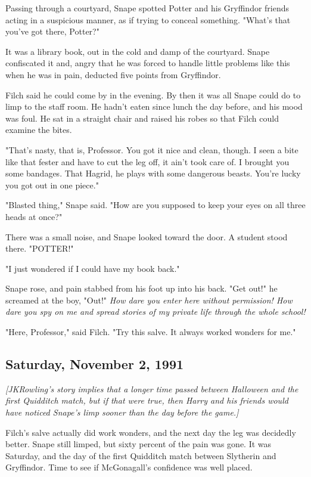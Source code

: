 \documentclass[a4paper,11pt]{article}
\begin{document}
Passing through a courtyard, Snape spotted Potter and his Gryffindor friends acting in a suspicious manner, as if trying to conceal something. "What's that you've got there, Potter?"

It was a library book, out in the cold and damp of the courtyard. Snape confiscated it and, angry that he was forced to handle little problems like this when he was in pain, deducted five points from Gryffindor.

Filch said he could come by in the evening. By then it was all Snape could do to limp to the staff room. He hadn't eaten since lunch the day before, and his mood was foul. He sat in a straight chair and raised his robes so that Filch could examine the bites.

"That's nasty, that is, Professor. You got it nice and clean, though. I seen a bite like that fester and have to cut the leg off, it ain't took care of. I brought you some bandages. That Hagrid, he plays with some dangerous beasts. You're lucky you got out in one piece."

"Blasted thing," Snape said. "How are you supposed to keep your eyes on all three heads at once?"

There was a small noise, and Snape looked toward the door. A student stood there. "POTTER!"

"I just wondered if I could have my book back."

Snape rose, and pain stabbed from his foot up into his back. "Get out!" he screamed at the boy, "Out!" \emph{How dare you enter here without permission! How dare you spy on me and spread stories of my private life through the whole school!}

"Here, Professor," said Filch. "Try this salve. It always worked wonders for me."

\subsection{Saturday, November 2, 1991}

\emph{[JKRowling's story implies that a longer time passed between Halloween and the first Quidditch match, but if that were true, then Harry and his friends would have noticed Snape's limp sooner than the day before the game.]}

Filch's salve actually did work wonders, and the next day the leg was decidedly better. Snape still limped, but sixty percent of the pain was gone. It was Saturday, and the day of the first Quidditch match between Slytherin and Gryffindor. Time to see if McGonagall's confidence was well placed.
\end{document}
